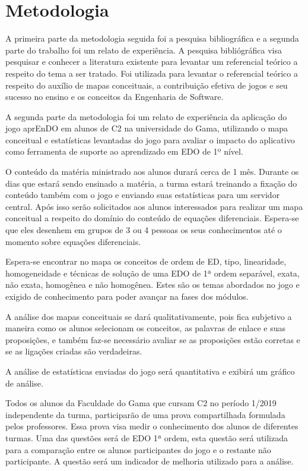\chapter[Metodologia]{Metodologia}
A primeira parte da metodologia seguida foi a pesquisa bibliográfica e a segunda parte do trabalho foi um relato de experiência. A pesquisa bibliógráfica visa pesquisar e conhecer a literatura existente para levantar um referencial teórico a respeito do tema a ser tratado. Foi utilizada para levantar o referencial teórico a respeito do auxílio de mapas conceituais, a contribuição efetiva de jogos e seu sucesso no ensino e os conceitos da Engenharia de Software.

A segunda parte da metodologia foi um relato de experiência da aplicação do jogo aprEnDO em alunos de C2 na universidade do Gama, utilizando o mapa conceitual e estatísticas levantadas do jogo para avaliar o impacto do aplicativo como ferramenta de suporte ao aprendizado em EDO de 1º nível.

O conteúdo da matéria ministrado aos alunos durará cerca de 1 mês. Durante os dias que estará sendo ensinado a matéria, a turma estará treinando a fixação do conteúdo também com o jogo e enviando suas estatísticas para um servidor central. Após isso serão solicitados aos alunos interessados para realizar um mapa conceitual a respeito do domínio do conteúdo de equações diferenciais. Espera-se que eles desenhem em grupos de 3 ou 4 pessoas os seus conhecimentos até o momento sobre equações diferenciais. 

Espera-se encontrar no mapa os conceitos de ordem de ED, tipo, linearidade, homogeneidade e técnicas de solução de uma EDO de 1ª ordem separável, exata, não exata, homogênea e não homogênea. Estes são os temas abordados no jogo e exigido de conhecimento para poder avançar na fases dos módulos.

A análise dos mapas conceituais se dará qualitativamente, pois fica subjetivo a maneira como os alunos selecionam os conceitos, as palavras de enlace e suas proposições, e também faz-se necessário avaliar se as proposições estão corretas e se as ligações criadas são verdadeiras.

A análise de estatísticas enviadas do jogo será quantitativa e exibirá um gráfico de análise. 

Todos os alunos da Faculdade do Gama que cursam C2 no período 1/2019 independente da turma, participarão de uma prova compartilhada formulada pelos professores. Essa prova visa medir o conhecimento dos alunos de diferentes turmas. Uma das questões será de EDO 1ª ordem, esta questão será utilizada para a comparação entre os alunos participantes do jogo e o restante não participante. A questão será um indicador de melhoria utilizado para a análise.

